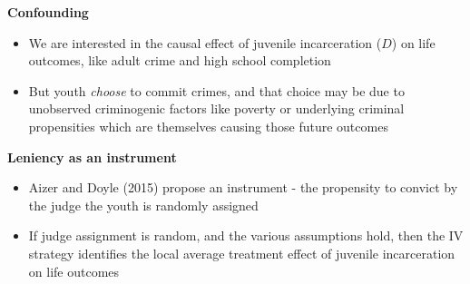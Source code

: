 \documentclass[notes=show]{beamer}
\begin{document}
\begin{frame}[plain]
\begin{center}
\textbf{Confounding}
\end{center}


		\begin{center}
		\end{center}
		
		\begin{itemize}
		\item We are interested in the causal effect of juvenile incarceration ($D$) on life outcomes, like adult crime and high school completion
		\item But youth \emph{choose} to commit crimes, and that choice may be due to unobserved criminogenic factors like poverty or underlying criminal propensities which are themselves causing those future outcomes
		\end{itemize}
		

\end{frame}

\begin{frame}[plain]
\begin{center}
\textbf{Leniency as an instrument}
\end{center}

		\begin{center}
		\end{center}
		
		\begin{itemize}
		\item Aizer and Doyle (2015) propose an instrument - the propensity to convict by the judge the youth is randomly assigned
		\item If judge assignment is random, and the various assumptions hold, then the IV strategy identifies the local average treatment effect of juvenile incarceration on life outcomes
		\end{itemize}

\end{frame}
\end{document}
